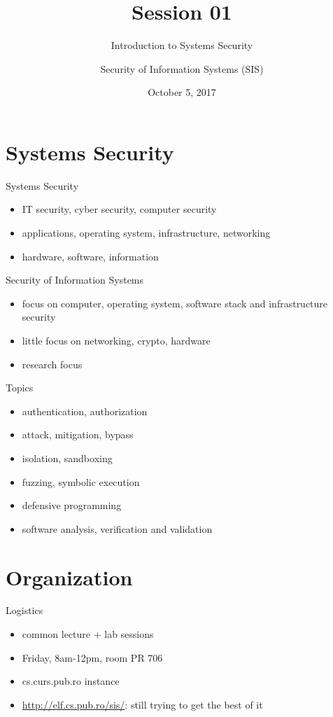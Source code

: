 \documentclass{curs}
\title[Session 01]{Session 01}
\subtitle{Introduction to Systems Security}
\author{Security of Information Systems (SIS)}
\date{October 5, 2017}
\begin{document}
\frame{\titlepage}


\section{Systems Security}

\begin{frame}{Systems Security}
  \begin{itemize}
    \item IT security, cyber security, computer security
    \item applications, operating system, infrastructure, networking
    \item hardware, software, information
  \end{itemize}
\end{frame}

\begin{frame}{Security of Information Systems}
  \begin{itemize}
    \item focus on computer, operating system, software stack and infrastructure security
    \item little focus on networking, crypto, hardware
    \item research focus
  \end{itemize}
\end{frame}

\begin{frame}{Topics}
  \begin{itemize}
    \item authentication, authorization
    \item attack, mitigation, bypass
    \item isolation, sandboxing
    \item fuzzing, symbolic execution
    \item defensive programming
    \item software analysis, verification and validation
  \end{itemize}
\end{frame}


\section{Organization}

\begin{frame}{Logistics}
  \begin{itemize}
    \item common lecture + lab sessions
    \item Friday, 8am-12pm, room PR 706
    \item cs.curs.pub.ro instance
    \item \url{http://elf.cs.pub.ro/sis/}: still trying to get the best of it
  \end{itemize}
\end{frame}
\end{document}
